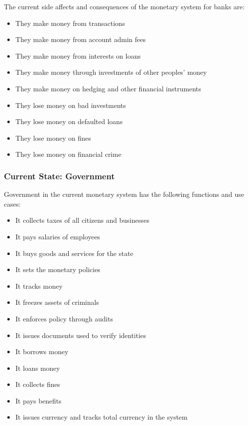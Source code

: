 \documentclass[12pt]{article} %
\begin{document}
{The current side affects and consequences of the monetary system for banks are:

\begin{itemize}
	\item They make money from transactions
	\item They make money from account admin fees
	\item They make money from interests on loans
	\item They make money through investments of other peoples' money
	\item They make money on hedging and other financial instruments
	\item They lose money on bad investments
	\item They lose money on defaulted loans
	\item They lose money on fines
	\item They lose money on financial crime
\end{itemize}

\subsubsection{Current State: Government} \label{sssec:4.3:government}

Government in the current monetary system has the following functions and use cases:

\begin{itemize}
	\item It collects taxes of all citizens and businesses
	\item It pays salaries of employees
	\item It buys goods and services for the state
	\item It sets the monetary policies
	\item It tracks money
	\item It freezes assets of criminals
	\item It enforces policy through audits
	\item It issues documents used to verify identities
	\item It borrows money
	\item It loans money
	\item It collects fines
	\item It pays benefits
	\item It issues currency and tracks total currency in the system
\end{itemize}

}
\end{document}
